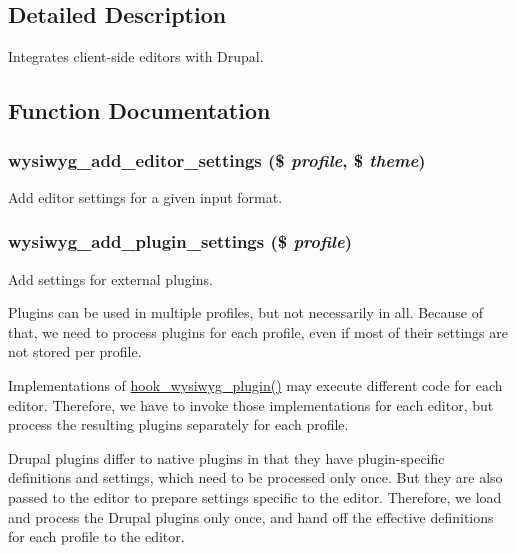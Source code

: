 \subsection{Detailed Description}
Integrates client-\/side editors with Drupal. 

\subsection{Function Documentation}
\hypertarget{wysiwyg_8module_ad6164d5e50ac72e9db93a555f5ed7941}{
\subsubsection[{wysiwyg\_\-add\_\-editor\_\-settings}]{\setlength{\rightskip}{0pt plus 5cm}wysiwyg\_\-add\_\-editor\_\-settings (\$ {\em profile}, \/  \$ {\em theme})}}
\label{wysiwyg_8module_ad6164d5e50ac72e9db93a555f5ed7941}
Add editor settings for a given input format. \hypertarget{wysiwyg_8module_ab2d3844da95500eafb246c12e44593c3}{
\subsubsection[{wysiwyg\_\-add\_\-plugin\_\-settings}]{\setlength{\rightskip}{0pt plus 5cm}wysiwyg\_\-add\_\-plugin\_\-settings (\$ {\em profile})}}
\label{wysiwyg_8module_ab2d3844da95500eafb246c12e44593c3}
Add settings for external plugins.

Plugins can be used in multiple profiles, but not necessarily in all. Because of that, we need to process plugins for each profile, even if most of their settings are not stored per profile.

Implementations of \hyperlink{wysiwyg_8api_8php_abad2b35b32be0b20d73006b73205045c}{hook\_\-wysiwyg\_\-plugin()} may execute different code for each editor. Therefore, we have to invoke those implementations for each editor, but process the resulting plugins separately for each profile.

Drupal plugins differ to native plugins in that they have plugin-\/specific definitions and settings, which need to be processed only once. But they are also passed to the editor to prepare settings specific to the editor. Therefore, we load and process the Drupal plugins only once, and hand off the effective definitions for each profile to the editor.


